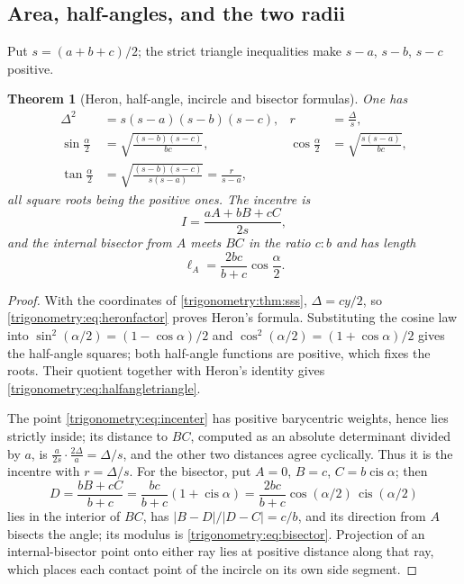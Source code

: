 \documentclass[11pt,letterpaper]{article}
\numberwithin{equation}{section}
\newtheorem{theorem}{Theorem}[section]
\theoremstyle{definition}
\theoremstyle{remark}
\newcommand{\cis}{\operatorname{cis}}
\begin{document}
\subsection{Area, half-angles, and the two radii}
Put $s=(a+b+c)/2$; the strict triangle inequalities make $s-a$, $s-b$, $s-c$ positive.

\begin{theorem}[Heron, half-angle, incircle and bisector formulas]\label{trigonometry:thm:heron}
One has
\begin{align}
 \Delta^2&=s(s-a)(s-b)(s-c),& r&=\frac\Delta s,\\
 \sin\frac\alpha2&=\sqrt{\frac{(s-b)(s-c)}{bc}},&
 \cos\frac\alpha2&=\sqrt{\frac{s(s-a)}{bc}},\\
 \tan\frac\alpha2&=\sqrt{\frac{(s-b)(s-c)}{s(s-a)}}=\frac r{s-a},
 \label{trigonometry:eq:halfangletriangle}
\end{align}
all square roots being the positive ones. The incentre is
\begin{equation}\label{trigonometry:eq:incenter}
 I=\frac{aA+bB+cC}{2s},
\end{equation}
and the internal bisector from $A$ meets $BC$ in the ratio $c:b$ and has length
\begin{equation}\label{trigonometry:eq:bisector}
 \ell_A=\frac{2bc}{b+c}\cos\frac\alpha2 .
\end{equation}
\end{theorem}
\begin{proof}
With the coordinates of \cref{trigonometry:thm:sss}, $\Delta=cy/2$, so
\cref{trigonometry:eq:heronfactor} proves Heron's formula. Substituting the cosine law into
$\sin^2(\alpha/2)=(1-\cos\alpha)/2$ and $\cos^2(\alpha/2)=(1+\cos\alpha)/2$ gives the half-angle
squares; both half-angle functions are positive, which fixes the roots. Their quotient together
with Heron's identity gives \cref{trigonometry:eq:halfangletriangle}.

The point \cref{trigonometry:eq:incenter} has positive barycentric weights, hence lies strictly
inside; its distance to $BC$, computed as an absolute determinant divided by $a$, is
$\frac a{2s}\cdot\frac{2\Delta}a=\Delta/s$, and the other two distances agree cyclically. Thus it
is the incentre with $r=\Delta/s$. For the bisector, put $A=0$, $B=c$, $C=b\cis\alpha$; then
\[
 D=\frac{bB+cC}{b+c}=\frac{bc}{b+c}(1+\cis\alpha)
 =\frac{2bc}{b+c}\cos(\alpha/2)\,\cis(\alpha/2)
\]
lies in the interior of $BC$, has $|B-D|/|D-C|=c/b$, and its direction from $A$ bisects the angle;
its modulus is \cref{trigonometry:eq:bisector}. Projection of an internal-bisector point onto either
ray lies at positive distance along that ray, which places each contact point of the incircle on
its own side segment.
\end{proof}
\end{document}
